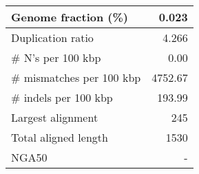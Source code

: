 \documentclass[12pt,a4paper]{article}
\begin{document}
\begin{table}[ht]
\begin{center}
\begin{tabular}{|l*{1}{|r}|}
Genome fraction (\%) & 0.023 \\ \hline
Duplication ratio & 4.266 \\ \hline
\# N's per 100 kbp & 0.00 \\ \hline
\# mismatches per 100 kbp & 4752.67 \\ \hline
\# indels per 100 kbp & 193.99 \\ \hline
Largest alignment & 245 \\ \hline
Total aligned length & 1530 \\ \hline
NGA50 & - \\ \hline
\end{tabular}
\end{center}
\end{table}
\end{document}
